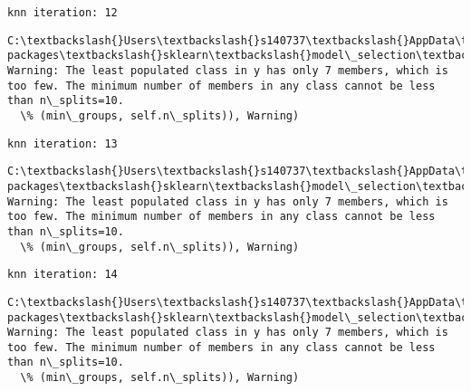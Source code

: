 \documentclass[11pt]{article}
\begin{document}
    \begin{Verbatim}[commandchars=\\\{\}]
knn iteration: 12 

    \end{Verbatim}

    \begin{Verbatim}[commandchars=\\\{\}]
C:\textbackslash{}Users\textbackslash{}s140737\textbackslash{}AppData\textbackslash{}Local\textbackslash{}Continuum\textbackslash{}anaconda3\textbackslash{}lib\textbackslash{}site-packages\textbackslash{}sklearn\textbackslash{}model\_selection\textbackslash{}\_split.py:605: Warning: The least populated class in y has only 7 members, which is too few. The minimum number of members in any class cannot be less than n\_splits=10.
  \% (min\_groups, self.n\_splits)), Warning)

    \end{Verbatim}

    \begin{Verbatim}[commandchars=\\\{\}]
knn iteration: 13 

    \end{Verbatim}

    \begin{Verbatim}[commandchars=\\\{\}]
C:\textbackslash{}Users\textbackslash{}s140737\textbackslash{}AppData\textbackslash{}Local\textbackslash{}Continuum\textbackslash{}anaconda3\textbackslash{}lib\textbackslash{}site-packages\textbackslash{}sklearn\textbackslash{}model\_selection\textbackslash{}\_split.py:605: Warning: The least populated class in y has only 7 members, which is too few. The minimum number of members in any class cannot be less than n\_splits=10.
  \% (min\_groups, self.n\_splits)), Warning)

    \end{Verbatim}

    \begin{Verbatim}[commandchars=\\\{\}]
knn iteration: 14 

    \end{Verbatim}

    \begin{Verbatim}[commandchars=\\\{\}]
C:\textbackslash{}Users\textbackslash{}s140737\textbackslash{}AppData\textbackslash{}Local\textbackslash{}Continuum\textbackslash{}anaconda3\textbackslash{}lib\textbackslash{}site-packages\textbackslash{}sklearn\textbackslash{}model\_selection\textbackslash{}\_split.py:605: Warning: The least populated class in y has only 7 members, which is too few. The minimum number of members in any class cannot be less than n\_splits=10.
  \% (min\_groups, self.n\_splits)), Warning)

    \end{Verbatim}
\end{document}
